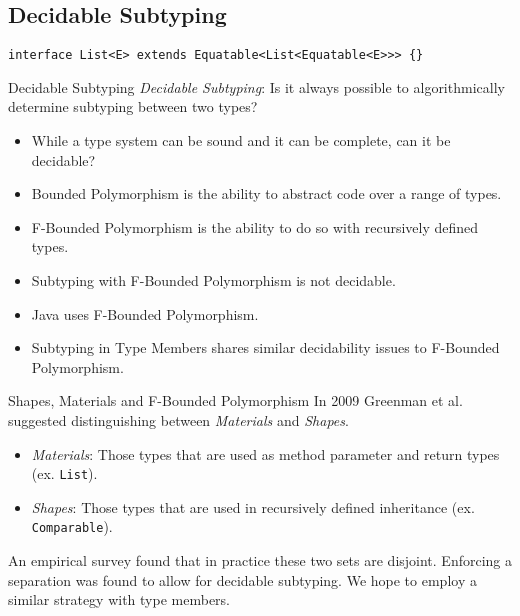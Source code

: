 \documentclass[dvipsnames]{beamer}
\begin{document}
\subsection{Decidable Subtyping}

\begin{lrbox}{\tmFBound}
\begin{lstlisting}[mathescape, style=customlang]
interface List<E> extends Equatable<List<Equatable<E>>> {}
\end{lstlisting}
\end{lrbox}

\begin{frame}{Decidable Subtyping}
\emph{Decidable Subtyping}: Is it always possible to algorithmically determine subtyping between two types?
\begin{itemize}
\item
While a type system can be sound and it can be complete, can it be decidable? 
\item
Bounded Polymorphism is the ability to abstract code over a range of types. 
\item
F-Bounded Polymorphism is the ability to do so with recursively defined types.
\item
Subtyping with F-Bounded Polymorphism is not decidable.
\item
Java uses F-Bounded Polymorphism.
\begin{block}{ }
\usebox{\tmFBound}
\end{block}
\item
Subtyping in Type Members shares similar decidability issues to F-Bounded Polymorphism.
\end{itemize}
\end{frame}

\begin{frame}{Shapes, Materials and F-Bounded Polymorphism}
In 2009 Greenman et al. suggested distinguishing between \emph{Materials} and \emph{Shapes}.
\begin{itemize}
\item
\emph{Materials}: Those types that are used as method parameter and return types (ex. \texttt{List}).
\item
\emph{Shapes}: Those types that are used in recursively defined inheritance (ex. \texttt{Comparable}).
\end{itemize}
An empirical survey found that in practice these two sets are disjoint. Enforcing a separation was found to allow for decidable subtyping. We hope to employ a similar strategy with type members.
\end{frame}
\end{document}
